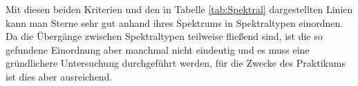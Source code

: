 Mit diesen beiden Kriterien und den in Tabelle \ref{tab:Spektral} dargestellten Linien kann man Sterne sehr gut anhand ihres Spektrums in Spektraltypen einordnen. Da die Übergänge zwischen Spektraltypen teilweise fließend sind, ist die so gefundene Einordnung aber manchmal nicht eindeutig und es muss eine gründlichere Untersuchung durchgeführt werden, für die Zwecke des Praktikums ist dies aber ausreichend.